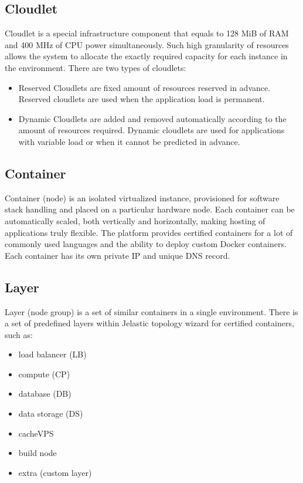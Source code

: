\documentclass[9pt,twocolumn,twoside]{../../styles/osajnl}
\begin{document}
\subsection{Cloudlet}
Cloudlet is a special infrastructure component that equals to 128 MiB of RAM and
400 MHz of CPU power simultaneously. Such high granularity of resources allows
the system to allocate the exactly required capacity for each instance in the
environment. There are two types of cloudlets:
\begin{itemize}
\renewcommand{\labelitemi}{\scriptsize$\square$}
\item Reserved Cloudlets are fixed amount of resources reserved in advance.
Reserved cloudlets are used when the application load is permanent.
\item Dynamic Cloudlets are added and removed automatically according to the
amount of resources required. Dynamic cloudlets are used for applications with
variable load or when it cannot be predicted in advance.
\end{itemize}\cite{www-jelastic1}

\subsection{Container}
Container (node) is an isolated virtualized instance, provisioned for software
stack handling and placed on a particular hardware node. Each container can be
automatically scaled, both vertically and horizontally, making hosting of
applications truly flexible. The platform provides certified containers for a
lot of commonly used languages and the ability to deploy custom Docker
containers. Each container has its own private IP and unique DNS record.\cite{www-jelastic4}

\subsection{Layer}
Layer (node group) is a set of similar containers in a single environment. There
is a set of predefined layers within Jelastic topology wizard for certified
containers, such as:\cite{paper-jelastic1}
\begin{itemize}
\renewcommand{\labelitemi}{\scriptsize$\square$}
\item load balancer (LB)
\item compute (CP)
\item database (DB)
\item data storage (DS)
\item cacheVPS
\item build node
\item extra (custom layer)
\end{itemize}\cite{www-jelastic1}
\end{document}
